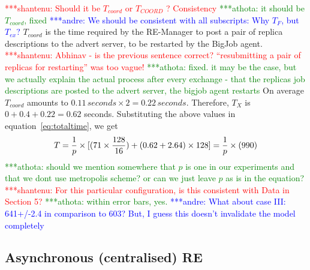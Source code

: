 \documentclass{rspublic}
\newcommand{\jhanote}[1]{ {\textcolor{red} { ***shantenu: #1 }}}
\newcommand{\alnote}[1]{ {\textcolor{blue} { ***andre: #1 }}}
\newcommand{\athotanote}[1]{ {\textcolor{green} { ***athota: #1 }}}
\newcommand{\alnote}[1]{}
\newcommand{\athotanote}[1]{}
\newcommand{\jhanote}[1]{}
\begin{document}
\jhanote{Should it be $T_{coord}$ or $T_{COORD}$ ? Consistency} \athotanote{it should be $T_{coord}$, fixed} \alnote{We should be consistent with all subscripts: Why $T_F$, but $T_{ex}$?}
$T_{coord}$ is the time required by the RE-Manager to post a pair 
of replica descriptions to the advert server, to be restarted by the BigJob agent. \jhanote{Abhinav - is the previous sentence correct?
  ``resubmitting a pair of replicas for restarting'' was too vague!} \athotanote{fixed. it may be the case, but we actually explain the actual process after every exchange - that the replicas job descriptions are posted to the advert server, the bigjob agent restarts}
On average $T_{coord}$ amounts to $0.11\,seconds \times 2 =
0.22\,seconds$. Therefore, $T_{X}$ is $0+0.4+0.22=0.62$ seconds.
Substituting the above values in equation~\ref{eq:totaltime}, we get
\begin{eqnarray}
  T=  {1 \over p} \times {[ {(71\times {128\over 16}})+ (0.62 + 2.64)\times 128]} = {1 \over p} \times (990)
\label{eq:sync}
\end{eqnarray}
\athotanote{should we mention somewhere that $p$ is one in our experiments and that we dont use metropolis scheme? or can we just leave $p$ as is in the equation?}
\jhanote{For this particular configuration, is this consistent with
  Data in Section 5?} \athotanote{within error bars, yes.} 
  \alnote{What about case III: 641+/-2.4 in comparison to 603? But, I guess this doesn't invalidate the model completely}

\subsection{Asynchronous (centralised) RE}


\end{document}
